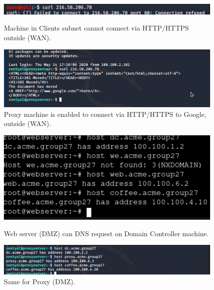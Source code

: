 \begin{figure}[H]
\centering
\begin{minipage}{.5\textwidth}
  \centering
  \includegraphics[width=1\textwidth]{clientCANNOTGoOut.png}
  \caption[a]{Machine in Clients subnet cannot connect via HTTP/HTTPS outside (WAN).}\label{fig:3}
\end{minipage}%
\begin{minipage}{.5\textwidth}
  \centering
  \includegraphics[width=1\textwidth]{proxyCanGoOutToHaveFun.png}
  \caption[a]{Proxy machine is enabled to connect via HTTP/HTTPS to Google, outside (WAN).}\label{fig:4}
\end{minipage}
\end{figure}

\begin{figure}[H]
\centering
\begin{minipage}{.5\textwidth}
  \centering
  \includegraphics[width=1\textwidth]{dnsWorkingWebServer.png}
  \caption[a]{Web server (DMZ) can DNS request on Domain Controller machine.}\label{fig:5}
\end{minipage}%
\begin{minipage}{.5\textwidth}
  \centering
  \includegraphics[width=1\textwidth]{DMZCanuseDNSService.png}
  \caption[a]{Same for Proxy (DMZ).}\label{fig:6}
\end{minipage}
\end{figure}


